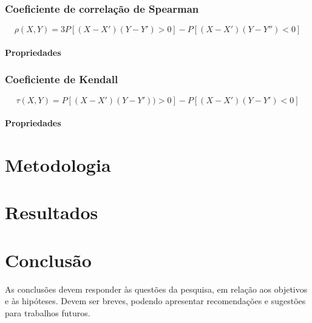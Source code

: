 \documentclass[
	12pt,				%
	oneside,			%
	a4paper,			%
	chapter=TITLE,		%
	section=TITLE,		%
	english,			%
	brazil				%
	]{abntex2}
\begin{document}
\hypertarget{coeficiente-de-correlauxe7uxe3o-de-spearman}{%
\subsection{Coeficiente de correlação de Spearman}\label{coeficiente-de-correlauxe7uxe3o-de-spearman}}

\[\rho(X, Y ) = 3P[(X - X')(Y - Y') > 0] - P[(X - X')(Y - Y'' ) < 0]\]

\hypertarget{propriedades-1}{%
\subsubsection{Propriedades}\label{propriedades-1}}

\hypertarget{coeficiente-de-kendall}{%
\subsection{Coeficiente de Kendall}\label{coeficiente-de-kendall}}

\[\tau(X, Y ) = P[(X - X')(Y - Y')) > 0] - P[(X - X')(Y - Y') < 0]\]

\hypertarget{propriedades-2}{%
\subsubsection{Propriedades}\label{propriedades-2}}

\hypertarget{metodologia}{%
\chapter{Metodologia}\label{metodologia}}

\hypertarget{resultados}{%
\chapter{Resultados}\label{resultados}}

\hypertarget{conclusao}{%
\chapter{Conclusão}\label{conclusao}}

As conclusões devem responder às questões da pesquisa, em relação aos objetivos
e às hipóteses. Devem ser breves, podendo apresentar recomendações e sugestões
para trabalhos futuros.

\postextual

\begingroup

\printbibliography[title=REFERÊNCIAS]
\end{document}
